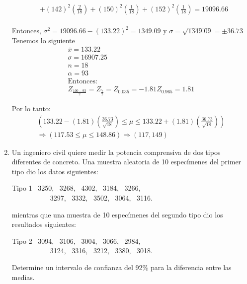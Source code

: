 \begin{enumerate}
\begin{align*}
        &+ (142)^2\left( \frac{2}{18} \right) + (150)^2\left( \frac{1}{18} \right) + (152)^2\left( \frac{1}{18} \right)  = 19096.66 
    \end{align*}
    \\
    Entonces, $ \sigma^2 = 19096.66 -(133.22)^2 = 1349.09 $ y $\sigma = \sqrt{1349.09} = \pm 36.73 $ \\
    Tenemos lo siguiente \\
    \begin{gather*}
    \overline{x} = 133.22 \\ 
    \sigma = 16907.25 \\
    n = 18  \\
    \alpha = 93 \\ 
    \text{Entonces:} \\
     Z_{ \frac{100-93}{2} }  =  Z_{ \frac{7}{2} } = Z_{0.035} = -1.81    Z_{0.965} = 1.81 
    \end{gather*}
    
    Por lo tanto: 
    \begin{gather*} \left( 133.22 - (1.81) \left( \frac{36.73}{\sqrt{18}} \right) \leq  \mu \leq 133.22 + (1.81) \left( \frac{36.73}{\sqrt{18}} \right) \right)  \\
    \Rightarrow  \left( 117.53 \leq \mu \leq 148.86 \right) \Rightarrow \left( 117,149 \right) \end{gather*}
    \item Un ingeniero civil quiere medir la potencia comprensiva de dos tipos diferentes de concreto. Una muestra aleatoria de 10 especímenes del primer tipo dio los datos siguientes:
    
    \begin{center} Tipo 1 \ 3250, \ 3268, \ 4302, \ 3184, \ 3266, \\
        \ \ \ \ \ \ \ \ \ \ \ 3297, \ 3332, \ 3502, \ 3064, \ 3116. 
    \end{center}
    mientras que una muestra de 10 especímenes del segundo tipo dio los resultados siguientes:
    
    \begin{center} Tipo 2 \ 3094, \ 3106, \ 3004, \ 3066, \ 2984, \\
        \ \ \ \ \ \ \ \ \ \ \ 3124, \ 3316, \ 3212, \ 3380, \ 3018. 
    \end{center}
    
    Determine un intervalo de confianza del 92\% para la diferencia entre las medias. \\
    

\end{enumerate}
